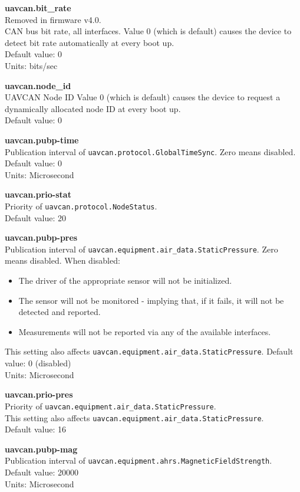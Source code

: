 \documentclass{zubaxdoc}
\begin{document}
\textbf{uavcan.bit{\_}rate}\\
Removed in firmware v4.0.\\
CAN bus bit rate, all interfaces. Value 0 (which is default) causes the device to detect bit rate automatically at every boot up.\\
Default value: 0\\
Units: bits/sec

\textbf{uavcan.node{\_}id}\\
UAVCAN Node ID Value 0 (which is default) causes the device to request a dynamically allocated node ID at every boot up.\\
Default value: 0

\textbf{uavcan.pubp-time}\\
Publication interval of \texttt{uavcan.protocol.GlobalTimeSync}. Zero means disabled.\\
Default value: 0\\
Units: Microsecond

\textbf{uavcan.prio-stat}\\
Priority of \texttt{uavcan.protocol.NodeStatus}.\\
Default value: 20

\textbf{uavcan.pubp-pres}\\
Publication interval of \texttt{uavcan.equipment.air{\_}data.StaticPressure}. Zero means disabled. When disabled:
\begin{itemize}
\item The driver of the appropriate sensor will not be initialized.
\item The sensor will not be monitored - implying that, if it fails, it will not be detected and reported.
\item Measurements will not be reported via any of the available interfaces.
\end{itemize}
This setting also affects \texttt{uavcan.equipment.air{\_}data.StaticPressure}.
Default value: 0 (disabled)\\
Units: Microsecond

\textbf{uavcan.prio-pres}\\
Priority of \texttt{uavcan.equipment.air{\_}data.StaticPressure}.\\This setting also affects \texttt{uavcan.equipment.air{\_}data.StaticPressure}.\\
Default value: 16
 
\textbf{uavcan.pubp-mag}\\
Publication interval of \texttt{uavcan.equipment.ahrs.MagneticFieldStrength}.\\
Default value: 20000\\
Units: Microsecond
\end{document}
